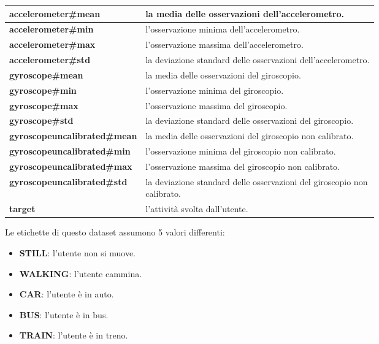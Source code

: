 \documentclass[../../Report.tex]{subfiles}
\begin{document}
\begin{table}[H]
    \centering
    \begin{tabular}{|l|p{0.7\linewidth}|}
        \hline
        \textbf{accelerometer\#mean} & la media delle osservazioni dell'accelerometro. \\
        \hline
        \textbf{accelerometer\#min} & l'osservazione minima dell'accelerometro. \\
        \hline
        \textbf{accelerometer\#max} & l'osservazione massima dell'accelerometro. \\
        \hline
        \textbf{accelerometer\#std} & la deviazione standard delle osservazioni dell'accelerometro. \\
        \hline
        \textbf{gyroscope\#mean} & la media delle osservazioni del giroscopio. \\
        \hline
        \textbf{gyroscope\#min} &  l'osservazione minima del giroscopio. \\
        \hline
        \textbf{gyroscope\#max} &  l'osservazione massima del giroscopio. \\
        \hline
        \textbf{gyroscope\#std} & la deviazione standard delle osservazioni del giroscopio. \\
        \hline
        \textbf{gyroscopeuncalibrated\#mean} & la media delle osservazioni del giroscopio non calibrato. \\
        \hline
        \textbf{gyroscopeuncalibrated\#min} &  l'osservazione minima del giroscopio non calibrato. \\
        \hline
        \textbf{gyroscopeuncalibrated\#max} & l'osservazione massima del giroscopio non calibrato. \\
        \hline
        \textbf{gyroscopeuncalibrated\#std} & la deviazione standard delle osservazioni del giroscopio non calibrato.\\
        \hline
        \textbf{target} & l'attività svolta dall'utente. \\
        \hline
    \end{tabular}
\end{table}
Le etichette di questo dataset assumono 5 valori differenti:
\begin{itemize}
    \item \textbf{STILL}: l'utente non si muove.
    \item \textbf{WALKING}: l'utente cammina.
    \item \textbf{CAR}: l'utente è in auto.
    \item \textbf{BUS}: l'utente è in bus.
    \item \textbf{TRAIN}: l'utente è in treno. 
\end{itemize}
\end{document}
